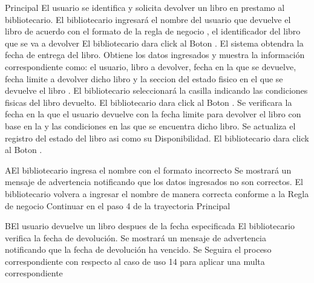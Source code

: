 	\begin{UCtrayectoria}{Principal}
		\UCpaso[\UCactor] El usuario se identifica y solicita devolver un libro en prestamo al bibliotecario.  
		\UCpaso[\UCactor] El bibliotecario ingresará el nombre del usuario que devuelve el libro de acuerdo con el formato de la regla de negocio , el identificador del libro que se va a devolver  
		\UCpaso[\UCactor] El bibliotecario dara click al Boton .
		\UCpaso[\UCsist] El sistema obtendra la fecha de entrega del libro.
				\UCpaso[\UCsist] Obtiene los datos ingresados y muestra la información correspondiente como: el usuario, libro a devolver, fecha en la que se devuelve, fecha limite a devolver dicho libro y la seccion del estado fisico en el que se devuelve el libro .
\UCpaso[\UCactor] El bibliotecario seleccionará la casilla indicando las condiciones fisicas del libro devuelto.						
						\UCpaso[\UCactor] El bibliotecario dara click al Boton  .
		\UCpaso[\UCsist] Se verificara la fecha en la que el usuario devuelve con la fecha limite para devolver el libro con base en la  y las condiciones en las que se encuentra dicho libro. 
				\UCpaso[\UCsist] Se actualiza el registro del estado del libro asi como su Disponibilidad.   
	\UCpaso[\UCactor] El bibliotecario dara click al Boton .
	\end{UCtrayectoria}
				\begin{UCtrayectoriaA}{A}{El bibliotecario ingresa el nombre con el formato incorrecto}
			\UCpaso[\UCsist] Se mostrará un mensaje de advertencia notificando que los datos ingresados no son correctos. 
			\UCpaso[\UCactor] El bibliotecario volvera a ingresar el nombre de manera correcta conforme a la Regla de negocio  
			\UCpaso[\UCsist]Continuar en el paso 4 de la trayectoria Principal
		\end{UCtrayectoriaA}


		\begin{UCtrayectoriaA}{B}{El usuario devuelve un libro despues de la fecha especificada}
			\UCpaso[\UCactor] El bibliotecario verifica la fecha de devolución.
			\UCpaso[\UCsist] Se mostrará un mensaje de advertencia notificando que la fecha de devolución ha vencido. 
			\UCpaso[\UCsist] Se Seguira el proceso correspondiente con respecto al caso de uso 14  para aplicar una multa correspondiente
		\end{UCtrayectoriaA}



